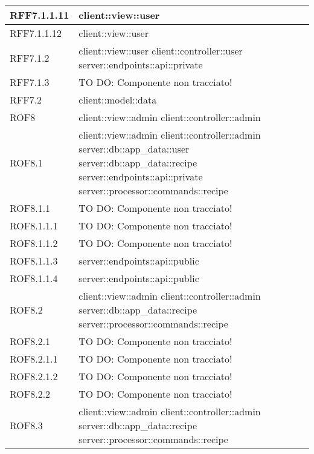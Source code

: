 \begin{center}
\begin{longtable}{| p{4cm} | p{8cm} |}
\hline
RFF7.1.1.11 & client::view::user \\
\hline
RFF7.1.1.12 & client::view::user \\
\hline
RFF7.1.2 & client::view::user \newline client::controller::user \newline server::endpoints::api::private \\
\hline
RFF7.1.3 & TO DO: Componente non tracciato! \\
\hline
RFF7.2 & client::model::data \\
\hline
ROF8 & client::view::admin \newline client::controller::admin \\
\hline
ROF8.1 & client::view::admin \newline client::controller::admin \newline server::db::app\_data::user \newline server::db::app\_data::recipe \newline server::endpoints::api::private \newline server::processor::commands::recipe \\
\hline
ROF8.1.1 & TO DO: Componente non tracciato! \\
\hline
ROF8.1.1.1 & TO DO: Componente non tracciato! \\
\hline
ROF8.1.1.2 & TO DO: Componente non tracciato! \\
\hline
ROF8.1.1.3 & server::endpoints::api::public \\
\hline
ROF8.1.1.4 & server::endpoints::api::public \\
\hline
ROF8.2 & client::view::admin \newline client::controller::admin \newline server::db::app\_data::recipe \newline server::processor::commands::recipe \\
\hline
ROF8.2.1 & TO DO: Componente non tracciato! \\
\hline
ROF8.2.1.1 & TO DO: Componente non tracciato! \\
\hline
ROF8.2.1.2 & TO DO: Componente non tracciato! \\
\hline
ROF8.2.2 & TO DO: Componente non tracciato! \\
\hline
ROF8.3 & client::view::admin \newline client::controller::admin \newline server::db::app\_data::recipe \newline server::processor::commands::recipe \\

\end{longtable}
\end{center}
